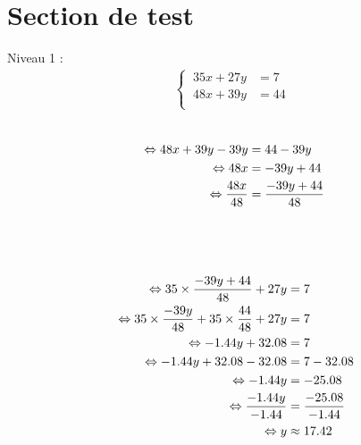 \documentclass{article}%
\begin{document}
%
\normalsize%
\fontsize{12}{10}%
\selectfont%
\section*{Section de test}%
\label{sec:Sectiondetest}%
Niveau 1 :%
\begin{align*}%
\begin{cases}%
\  35x + 27y &= 7 \\%
\  48x + 39y &= 44 \\%
\end{cases}%
\\%
\end{align*}%
\ \\%
\vspace{5mm}%
\newline%
\begin{align*}%
\  \Leftrightarrow 48x + 39y - 39y &= 44 - 39y \\%
\vspace{5mm}%
\newline%
\  \Leftrightarrow 48x &= -39y + 44\\%
\vspace{5mm}%
\newline%
\  \Leftrightarrow \frac{48x}{48} &= \frac{-39y + 44}{48}\\%
\vspace{5mm}%
\newline%
\end{align*}%
\\%
\ \\%
\vspace{5mm}%
\newline%
\begin{align*}%
\ \Leftrightarrow  35 \times \frac{-39y + 44}{48} + 27y &= 7\\%
\vspace{5mm}%
\newline%
\ \Leftrightarrow  35 \times \frac{-39y}{48} + 35 \times \frac{44}{48} + 27y &= 7\\%
\vspace{5mm}%
\newline%
\ \Leftrightarrow  -1.44y + 32.08 &= 7\\%
\vspace{5mm}%
\newline%
\ \Leftrightarrow  -1.44y + 32.08 - 32.08 &= 7 - 32.08\\%
\vspace{5mm}%
\newline%
\ \Leftrightarrow  -1.44y  &= -25.08\\%
\vspace{5mm}%
\newline%
\ \Leftrightarrow  \frac{-1.44y}{-1.44}  &= \frac{-25.08}{-1.44}\\%
\vspace{5mm}%
\newline%
\ \Leftrightarrow  y  &\approx 17.42\\%
\vspace{5mm}%
\newline%
\end{align*}%
\end{document}

